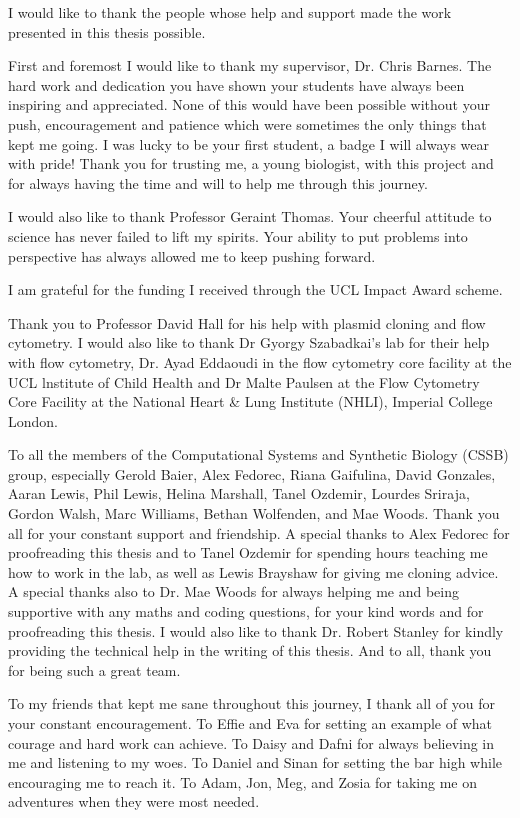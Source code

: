 \documentclass[]{phdthesis}
\begin{document}
\begin{acknowledgements}

I would like to thank the people whose help and support made the work presented in this thesis possible.


First and foremost I would like to thank my supervisor, Dr. Chris Barnes. The hard work and dedication you have shown your students have always been inspiring and appreciated. None of this would have been possible without your push, encouragement and patience which were sometimes the only things that kept me going. I was lucky to be your first student, a badge I will always wear with pride! Thank you for  trusting me, a young biologist, with this project and for always having the time and will to help me through this journey.

I would also like to thank Professor Geraint Thomas. Your cheerful attitude to science has never failed to lift my spirits. Your ability to put problems into perspective has always allowed me to keep pushing forward. 

I am grateful for the funding I received through the UCL Impact Award scheme.

Thank you to Professor David Hall for his help with plasmid cloning and flow cytometry. I would also like to thank Dr Gyorgy Szabadkai's lab for their help with flow cytometry, Dr. Ayad Eddaoudi in the flow cytometry core facility at the UCL lnstitute of Child Health and Dr Malte Paulsen at the Flow Cytometry Core Facility at the National Heart \& Lung Institute (NHLI), Imperial College London. 

To all the members of the Computational Systems and Synthetic Biology (CSSB) group, especially Gerold Baier, Alex Fedorec, Riana Gaifulina, David Gonzales, Aaran Lewis, Phil Lewis, Helina Marshall, Tanel Ozdemir, Lourdes Sriraja, Gordon Walsh, Marc Williams, Bethan Wolfenden, and Mae Woods. Thank you all for your constant support and friendship. A special thanks to Alex Fedorec for proofreading this thesis and to Tanel Ozdemir for spending hours teaching me how to work in the lab, as well as Lewis Brayshaw for giving me cloning advice. A special thanks also to Dr. Mae Woods for always helping me and being supportive with any maths and coding questions, for your kind words and for proofreading this thesis. I would also like to thank Dr. Robert Stanley for kindly providing the technical help in the writing of this thesis. And to all, thank you for being such a great team. 


To my friends that kept me sane throughout this journey, I thank all of you for your constant encouragement. To Effie and Eva for setting an example of what courage and hard work can achieve. To Daisy and Dafni for always believing in me and listening to my woes. To Daniel and Sinan for setting the bar high while encouraging me to reach it. To Adam, Jon, Meg, and Zosia for taking me on adventures when they were most needed. 


\end{acknowledgements}
\end{document}
